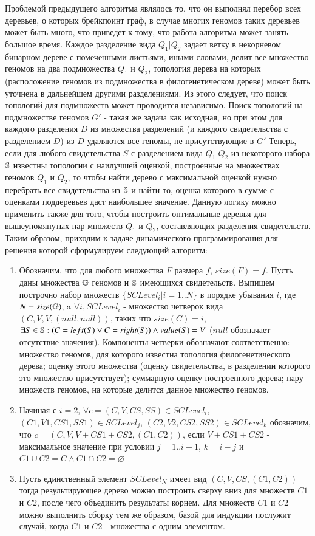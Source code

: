 Проблемой предыдущего алгоритма являлось то, что он выполнял перебор всех деревьев, о которых  брейкпоинт граф,
в случае многих геномов таких деревьев может быть много, что приведет к тому, что работа алгоритма может занять большое время.
Каждое разделение вида $Q_1|Q_2$ задает ветку в некорневом бинарном дереве с помеченными листьями, иными словами,
делит все множество геномов на два подмножества $Q_1$ и $Q_2$, топология дерева на которых
(расположение геномов из подмножества в филогенетическом дереве) может быть уточнена в дальнейшем другими разделениями.
Из этого следует, что поиск топологий для подмножеств может проводится независимо.
Поиск топологий на подмножестве геномов $G'$ - такая же задача как исходная, но при этом для каждого разделения $D$
из множества разделений (и каждого свидетельства с разделением $D$) из $D$ удаляются все геномы, не присутствующие в $G'$
Теперь, если для любого свидетельства $S$ с разделением вида $Q_1|Q_2$ из некоторого набора $\mathbb{S}$ известны топологии с наилучшей оценкой,
построенные на множествах геномов $Q_1$ и $Q_2$, то чтобы найти дерево с максимальной оценкой нужно перебрать все свидетельства из $\mathbb{S}$ и найти то,
оценка которого в сумме с оценками поддеревьев даст наибольшее значение.
Данную логику можно применить также для того, чтобы построить оптимальные деревья для вышеупомянутых пар множеств $Q_1$ и $Q_2$,
составляющих разделения свидетельств.
Таким образом, приходим к задаче динамического программирования для решения которой сформулируем следующий алгоритм:
\begin{enumerate}
  \item Обозначим, что для любого множества $F$ размера $f$, $size(F) = f$.
    Пусть даны множества $\mathbb{G}$ геномов и $\mathbb{S}$ имеющихся свидетельств.
    Выпишем построчно набор множеств $\{ SCLevel_i | i = 1..N \}$ в порядке убывания $i$, где $N = size(\mathbb{G})$,
    a $\forall i, SCLevel_i$ - множество четверок вида $(C, V, V, (null, null))$, таких что $size(C) = i$,
    $\exists S \in \mathbb{S}: (C = left(S) \lor C = right(S)) \land value(S) = V$ ($null$ обозначает отсутствие значения).
    Компоненты четверки обозначают соответственно: множество геномов, для которого известна топология филогенетического дерева;
    оценку этого множества (оценку свидетельства, в разделении которого это множество присутствует);
    суммарную оценку построенного дерева; пару множеств геномов, на которые делится данное множество геномов.
  \item Начиная с $i = 2$,
    $\forall c = (C, V, CS, SS) \in SCLevel_i$,
    $(C1, V1, CS1, SS1) \in SCLevel_j$,
    $(C2, V2, CS2, SS2) \in SCLevel_k$ обозначим, что $c = (C, V, V + CS1 + CS2, (C1, C2))$,
    если $V + CS1 + CS2$ - максимальное значение при условии  $j = 1..i-1$, $k = i - j$ и $C1 \cup C2 = C \land C1 \cap C2 = \varnothing$
  \item Пусть единственный элемент $SCLevel_N$ имеет вид $(C, V, CS, (C1, C2))$ тогда результирующее дерево можно построить сверху
    вниз для множеств $C1$ и $C2$, после чего объединить результаты корнем.
    Для множеств $C1$ и $C2$ можно выполнить сборку тем же образом, базой для индукции послужит случай,
    когда $C1$ и $C2$ - множества с одним элементом.
\end{enumerate}

